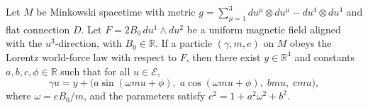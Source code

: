 Let $M$ be Minkowski spacetime with metric $g = \sum_{\mu=1}^{3} du^\mu \otimes du^\mu - du^4 \otimes du^4$ and flat connection $D$. Let $F = 2B_0\, du^1 \wedge du^2$ be a uniform magnetic field aligned with the $u^3$-direction, with $B_0 \in \mathbb{R}$. If a particle $(\gamma, m, e)$ on $M$ obeys the Lorentz world-force law with respect to $F$, then there exist $y \in \mathbb{R}^4$ and constants $a, b, c, \phi \in \mathbb{R}$ such that for all $u \in \mathcal{E}$,
$$\gamma u = y + \bigl(a\sin(\omega m u + \phi),\; a\cos(\omega m u + \phi),\; b m u,\; c m u\bigr),$$
where $\omega = eB_0/m$, and the parameters satisfy $c^2 = 1 + a^2\omega^2 + b^2$.
